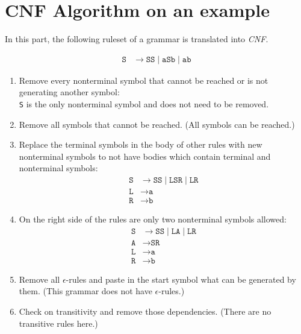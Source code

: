 \documentclass[a4paper, 11pt]{article}
\begin{document}







\newpage
\section{CNF Algorithm on an example}

\label{createcnf}

In this part, the following ruleset of a grammar is translated into \textit{CNF}.

\begin{align*}
\texttt{S} & \rightarrow \texttt{SS} \mid  \texttt{aSb} \mid \texttt{ab} 
\end{align*}

\begin{enumerate}

\item Remove every nonterminal symbol that cannot be reached or is not generating another symbol: \\
\texttt{S} is the only nonterminal symbol and does not need to be removed.

\item Remove all symbols that cannot be reached. (All symbols can be reached.)

\item Replace the terminal symbols in the body of other rules with new nonterminal symbols to not have bodies which contain terminal and nonterminal symbols:
\begin{align*}
\texttt{S} & \rightarrow \texttt{SS} \mid  \texttt{LSR} \mid \texttt{LR}  \\
\texttt{L} & \rightarrow \texttt{a} \\
\texttt{R} & \rightarrow \texttt{b} 
\end{align*}


\item On the right side of the rules are only two nonterminal symbols allowed:
\begin{align*}
\texttt{S} & \rightarrow \texttt{SS} \mid  \texttt{LA} \mid \texttt{LR}  \\
\texttt{A} & \rightarrow \texttt{SR} \\
\texttt{L} & \rightarrow \texttt{a} \\
\texttt{R} & \rightarrow \texttt{b} 
\end{align*}

\item Remove all $\epsilon$-rules and paste in the start symbol what can be generated by them. (This grammar does not have $\epsilon$-rules.)

\item Check on transitivity and remove those dependencies. (There are no transitive rules here.)

\end{enumerate}
\end{document}
